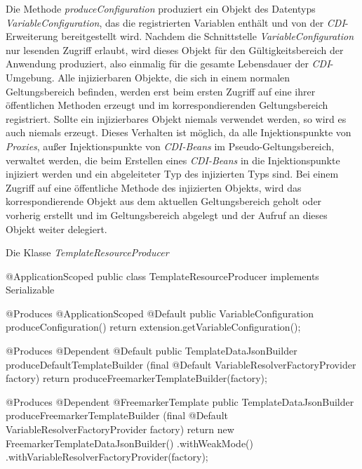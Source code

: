\newline
\newline
Die Methode \emph{produceConfiguration} produziert ein Objekt des Datentyps  \emph{VariableConfiguration}, das die registrierten Variablen enthält und von der \emph{CDI}-Erweiterung bereitgestellt wird. Nachdem die Schnittstelle  \emph{VariableConfiguration} nur lesenden Zugriff erlaubt, wird dieses Objekt für den Gültigkeitsbereich der Anwendung produziert, also einmalig für die gesamte Lebensdauer der \emph{CDI}-Umgebung.
\newline
\newline
Alle injizierbaren Objekte, die sich in einem normalen Geltungsbereich befinden,  werden erst beim ersten Zugriff auf eine ihrer öffentlichen Methoden erzeugt und im korrespondierenden Geltungsbereich registriert. Sollte ein injizierbares Objekt niemals verwendet werden, so wird es auch niemals erzeugt. Dieses Verhalten ist möglich, da alle Injektionspunkte von \emph{Proxies}, außer Injektionspunkte von \emph{CDI-Beans} im Pseudo-Geltungsbereich, verwaltet werden, die beim Erstellen eines \emph{CDI-Beans} in die Injektionspunkte injiziert werden und ein abgeleiteter Typ des injizierten Typs sind. Bei einem Zugriff auf eine öffentliche Methode des injizierten Objekts, wird das korrespondierende Objekt aus dem aktuellen Geltungsbereich geholt oder vorherig erstellt und im Geltungsbereich abgelegt und der Aufruf an dieses Objekt weiter delegiert. 

\begin{program}[h]
\caption{Die Klasse \emph{TemplateResourceProducer}}
\label{prog:templateResourceProducer}
\begin{JavaCode}
@ApplicationScoped
public class TemplateResourceProducer implements Serializable {

    @Produces
    @ApplicationScoped
    @Default
    public VariableConfiguration produceConfiguration() {
        return extension.getVariableConfiguration();
    }
    
    @Produces
    @Dependent
    @Default
    public TemplateDataJsonBuilder produceDefaultTemplateBuilder
          (final @Default VariableResolverFactoryProvider factory) {
        return produceFreemarkerTemplateBuilder(factory);
    }

    @Produces
    @Dependent
    @FreemarkerTemplate
    public TemplateDataJsonBuilder produceFreemarkerTemplateBuilder
           (final @Default VariableResolverFactoryProvider factory) {
        return new FreemarkerTemplateDataJsonBuilder()
                      .withWeakMode()
                      .withVariableResolverFactoryProvider(factory);
    }
    
}
\end{JavaCode}
\end{program} 

